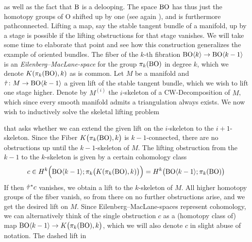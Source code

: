 as well as the fact that $\mathrm{B}$ is a delooping.
The space $\mathrm{BO}$ has thus just the homotopy groups of $\mathrm{O}$ shifted up by one (see again ), and is furthermore pathconnected.
Lifting a map, say the stable tangent bundle of a manifold, up by a stage is possible if the lifting obstructions for that stage vanishes.
We will take some time to elaborate that point and see how this construction generalizes the example of oriented bundles.
The fiber of the $k$-th fibration $\mathrm{BO}\langle k \rangle \to \mathrm{BO}\langle k -1 \rangle$ is an \emph{Eilenberg--MacLane-space} for the group $\pi_{k}(\mathrm{BO})$ in degree $k$, which we denote $K(\pi_k(\mathrm{BO}),k)$ as is common.
Let $M$ be a manifold and $\hat{\tau}\colon M\to \mathrm{BO}\langle k-1 \rangle$ a given lift of the stable tangent bundle, which we wish to lift one stage higher.
Denote by $M^{(i)}$ the $i$-skeleton of a CW-Decomposition of $M$, which since every smooth manifold admits a triangulation always exists.
We now wish to inductively solve the skeletal lifting problem
\begin{center}
\end{center}
that asks whether we can extend the given lift on the $i$-skeleton to the $i+1$-skeleton.
Since the Fiber $K\big(\pi_k(\mathrm{BO}),k\big)$ is $k-1$-connected, there are no obstructions up until the $k-1$-skeleton of $M$.
The lifting obstruction from the $k-1$ to the $k$-skeleton is given by a certain cohomology class 
\begin{equation*}
    c\in H^{k}\Big(\mathrm{BO}\langle k -1 \rangle;\pi_k\big(K(\pi_k(\mathrm{BO}),k)\big)\Big) = H^{k}\big(\mathrm{BO}\langle k-1 \rangle;\pi_k(\mathrm{BO})\big)
\end{equation*}
If then $\hat{\tau}^\ast c$ vanishes, we obtain a lift to the $k$-skeleton of $M$. 
All higher homotopy groups of the fiber vanish, so from there on no further obstructions arise, and we get the desired lift on $M$.
Since Eilenberg--MacLane-spaces represent cohomology, we can alternatively think of the single obstruction $c$ as a (homotopy class of) map $\mathrm{BO}\langle k-1 \rangle \to K\big(\pi_k(\mathrm{BO}),k\big)$, which we will also denote $c$ in slight abuse of notation.
The dashed lift in
\begin{center}
\end{center}
